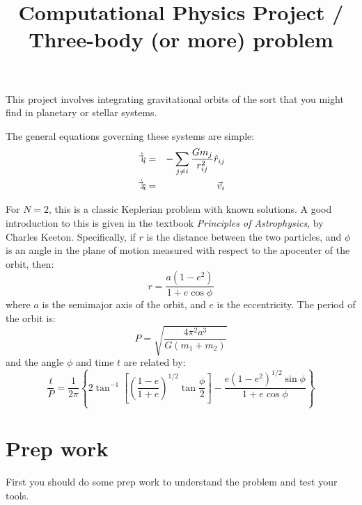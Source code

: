 \documentclass[11pt, preprint]{aastex}
\begin{document}
\title{\bf Computational Physics Project / Three-body (or more) problem}

This project involves integrating gravitational orbits of the sort
that you might find in planetary or stellar systems. 

The general equations governing these systems are simple:
\begin{eqnarray}
\dot{\vec{v}_i} &=& - \sum_{j \ne i} \frac{Gm_j}{r_{ij}^2} {\hat r}_{ij} \cr
\dot{\vec{x}_i} &=& \vec{v}_i
\end{eqnarray}

For $N=2$, this is a classic Keplerian problem with known solutions.
A good introduction to this is given in the textbook {\it Principles
  of Astrophysics}, by Charles Keeton. Specifically, if $r$ is the
distance between the two particles, and $\phi$ is an angle in the
plane of motion measured with respect to the apocenter of the orbit,
then:
\begin{equation}
r = \frac{a(1-e^2)}{1+e \cos\phi}
\end{equation}
where $a$ is the semimajor axis of the orbit, and $e$ is the
eccentricity. The period of the orbit is:
\begin{equation}
P = \sqrt{\frac{4\pi^2 a^3}{G(m_1 + m_2)}}
\end{equation}
and the angle $\phi$ and time $t$ are related by:
\begin{equation}
  \frac{t}{P} = \frac{1}{2\pi}\left\{
    2\tan^{-1}\left[\left(\frac{1-e}{1+e}\right)^{1/2}
      \tan\frac{\phi}{2}\right]
    - \frac{e(1-e^2)^{1/2} \sin\phi}{1+e\cos\phi}\right\}
\end{equation}

\section{Prep work}

First you should do some prep work to understand the problem and test
your tools.
\end{document}

